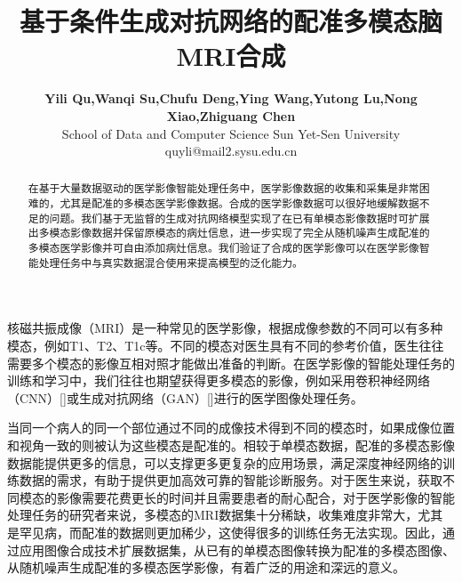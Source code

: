 \documentclass[letterpaper]{article} %
\title{基于条件生成对抗网络的配准多模态脑MRI合成}
\author{\Large \textbf{Yili Qu,Wanqi Su,Chufu Deng,Ying Wang,Yutong Lu,Nong Xiao,Zhiguang Chen}\\ %
School of Data and Computer Science Sun Yet-Sen University\\	
quyli@mail2.sysu.edu.cn%
}
\begin{document}
\maketitle

\begin{abstract}
在基于大量数据驱动的医学影像智能处理任务中，医学影像数据的收集和采集是非常困难的，尤其是配准的多模态医学影像数据。合成的医学影像数据可以很好地缓解数据不足的问题。我们基于无监督的生成对抗网络模型实现了在已有单模态影像数据时可扩展出多模态影像数据并保留原模态的病灶信息，进一步实现了完全从随机噪声生成配准的多模态医学影像并可自由添加病灶信息。我们验证了合成的医学影像可以在医学影像智能处理任务中与真实数据混合使用来提高模型的泛化能力。
\end{abstract}

\noindent 
核磁共振成像（MRI）是一种常见的医学影像，根据成像参数的不同可以有多种模态，例如T1、T2、T1c等。不同的模态对医生具有不同的参考价值，医生往往需要多个模态的影像互相对照才能做出准备的判断。在医学影像的智能处理任务的训练和学习中，我们往往也期望获得更多模态的影像，例如采用卷积神经网络（CNN）[]或生成对抗网络（GAN）[]进行的医学图像处理任务。

当同一个病人的同一个部位通过不同的成像技术得到不同的模态时，如果成像位置和视角一致的则被认为这些模态是配准的。相较于单模态数据，配准的多模态影像数据能提供更多的信息，可以支撑更多更复杂的应用场景，满足深度神经网络的训练数据的需求，有助于提供更加高效可靠的智能诊断服务。对于医生来说，获取不同模态的影像需要花费更长的时间并且需要患者的耐心配合，对于医学影像的智能处理任务的研究者来说，多模态的MRI数据集十分稀缺，收集难度非常大，尤其是罕见病，而配准的数据则更加稀少，这使得很多的训练任务无法实现。因此，通过应用图像合成技术扩展数据集，从已有的单模态图像转换为配准的多模态图像、从随机噪声生成配准的多模态医学影像，有着广泛的用途和深远的意义。
\end{document}
